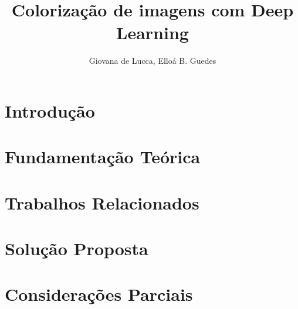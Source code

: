 \documentclass[12pt]{article}
\title{Colorização de imagens com Deep Learning}
\author{Giovana de Lucca, Elloá B. Guedes}
\begin{document}
\maketitle

\section{Introdução} \label{sec:introducao}


\section{Fundamentação Teórica} \label{sec:fundamentacao}


\section{Trabalhos Relacionados} \label{sec:relacionados}


\section{Solução Proposta} \label{sec:solucao}




\section{Considerações Parciais} \label{sec:consideracoes}



\end{document}
